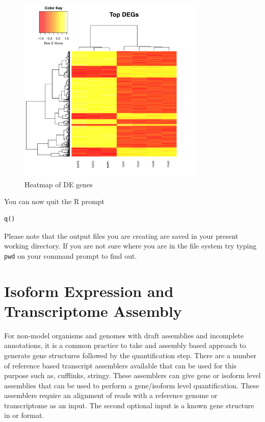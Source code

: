 \begin{steps}
\begin{figure}[H]
\centering
\includegraphics[width=0.8\textwidth]{handout/Heatmap.png}
\caption{Heatmap of DE genes}
\label{fig:Heatmap}
\end{figure}


You can now quit the R prompt
\begin{lstlisting}
q()
\end{lstlisting}
\end{steps}

\begin{note}
Please note that the output files you are creating are saved in your present working directory. If you are not sure where you are in the file system try typing \texttt{pwd} on your command prompt to find out.
\end{note}


\newpage
\section{Isoform Expression and Transcriptome Assembly}

\begin{information}
For non-model organisms and genomes with draft assemblies and incomplete annotations, it is a common practice to take and assembly based approach to generate gene structures followed by the quantification step. There are a number of reference based transcript assemblers available that can be used for this purpose such as, cufflinks, stringy. These assemblers can give gene or isoform level assemblies that can be used to perform a gene/isoform level quantification. These assemblers require an alignment of reads with a reference genome or transcriptome as an input. The second optional input is a known gene structure in  or  format. 
\end{information}

